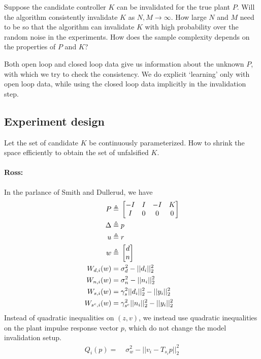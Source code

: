 \documentclass[11pt, onecolumn]{article}
\newcommand{\rb}[1]{{\color{red}{Ross: #1}}}
\theoremstyle{plain}
\theoremstyle{plain}
\theoremstyle{definition}
\begin{document}
Suppose the candidate controller $K$ can be invalidated for the true plant $P$.   Will
the algorithm consistently invalidate $K$ as $N,M\to\infty$.  How large $N$ and $M$ need to be so that the
algorithm can invalidate $K$ with high probability over the random noise in the experiments. How
does the sample complexity depends on the properties of $P$ and $K$?

Both open loop and closed loop data give us information about the unknown $P$, with which we try to
check the consistency.  We do explicit `learning' only with open loop data, while using the closed
loop data implicitly in the invalidation step.


\subsection{Experiment design}

Let the set of candidate $K$ be continuously parameterized. How to shrink the space efficiently to
obtain the set of unfalsified $K$.





\paragraph{Ross:}


\rb{I forget which covariance constraint things we came up with}
In the parlance of Smith and Dullerud, we have
\begin{align*}
P \triangleq &\; \begin{bmatrix}-I & I & -I & K\\I & 0 & 0 & 0\end{bmatrix}\\
\Delta \triangleq &\; p \\
u \triangleq &\; r \\
w \triangleq &\; \begin{bmatrix}d\\n\end{bmatrix}\\
W_{d,i}(w) = &\; \sigma_d^2 - ||d_i||_2^2\\
W_{n,i}(w) = &\; \sigma_n^2 - ||n_i||_2^2\\
W_{s,i}(w) = &\; \gamma_s^2||d_i||_2^2 - ||y_i||_2^2\\
W_{s^c,i}(w) = &\; \gamma_{s^c}^2||n_i||_2^2 - ||y_i||_2^2\\
\end{align*}
Instead of quadratic inequalities on $(z,v)$, we instead use quadratic inequalities on the plant impulse response vector $p$, which do not change the model invalidation setup.
\begin{align*}
Q_i(p) = &\; \sigma_w^2 - ||v_i - T_{s_i}p||_2^2
\end{align*}
\rb{Todo: quadratic equality constraints}
\end{document}
